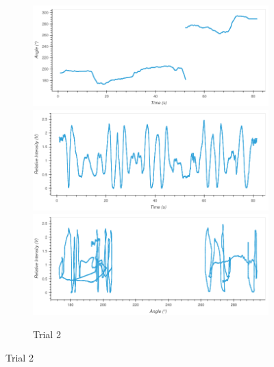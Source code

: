 \begin{figure}

\newlength{\plotwidth}
\setlength{\plotwidth}{0.33\textwidth}


\begin{subfigure}{1.0\textwidth}
\caption*{Trial 2}
\includegraphics[width=\plotwidth]{plots/t2-time-angle.png}
\includegraphics[width=\plotwidth]{plots/t2-time-intensity.png}
\includegraphics[width=\plotwidth]{plots/t2-angle-intensity.png}
\end{subfigure}




\end{figure}
